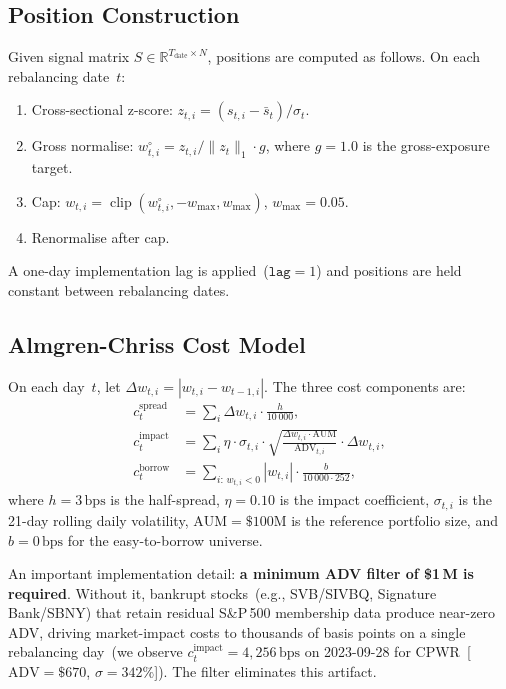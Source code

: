 \documentclass[journal]{IEEEtran}
\newcommand{\R}{\mathbb{R}}
\newcommand{\AUM}{\mathrm{AUM}}
\newcommand{\ADV}{\mathrm{ADV}}
\newcommand{\bps}{\,\mathrm{bps}}
\begin{document}
\subsection{Position Construction}
Given signal matrix $S \in \R^{T_\text{date}\times N}$, positions
are computed as follows.
On each rebalancing date~$t$:
\begin{enumerate}
  \item Cross-sectional z-score: $z_{t,i} = (s_{t,i} - \bar s_t)/\sigma_t$.
  \item Gross normalise: $w^\circ_{t,i} = z_{t,i}/\|z_t\|_1 \cdot g$,
        where $g = 1.0$ is the gross-exposure target.
  \item Cap: $w_{t,i} = \operatorname{clip}(w^\circ_{t,i},
        -w_{\max}, w_{\max})$, $w_{\max} = 0.05$.
  \item Renormalise after cap.
\end{enumerate}
A one-day implementation lag is applied~($\texttt{lag}=1$) and
positions are held constant between rebalancing dates.

\subsection{Almgren-Chriss Cost Model}
On each day~$t$, let $\Delta w_{t,i} = |w_{t,i} - w_{t-1,i}|$.
The three cost components are:
\begin{align}
  c^\text{spread}_t &= \sum_i \Delta w_{t,i}
                        \cdot \frac{h}{10\,000}, \label{eq:spread}\\[4pt]
  c^\text{impact}_t &= \sum_i \eta \cdot \sigma_{t,i}
                        \cdot \sqrt{\frac{\Delta w_{t,i} \cdot \AUM}{\ADV_{t,i}}}
                        \cdot \Delta w_{t,i}, \label{eq:impact}\\[4pt]
  c^\text{borrow}_t &= \sum_{i:\,w_{t,i}<0} |w_{t,i}|
                        \cdot \frac{b}{10\,000\cdot252},
  \label{eq:borrow}
\end{align}
where $h = 3\bps$ is the half-spread, $\eta = 0.10$ is the impact
coefficient, $\sigma_{t,i}$ is the 21-day rolling daily volatility,
$\AUM = \$100$M is the reference portfolio size, and $b = 0\bps$
for the easy-to-borrow universe.

An important implementation detail:
\textbf{a minimum ADV filter of \$1\,M is required}.
Without it, bankrupt stocks~(e.g., SVB/SIVBQ, Signature
Bank/SBNY) that retain residual S\&P\,500 membership data produce
near-zero ADV, driving market-impact costs to thousands of basis
points on a single rebalancing day~(we observe
$c^\text{impact}_t = 4{,}256\bps$ on 2023-09-28 for
CPWR~[$\ADV = \$670$, $\sigma = 342\%$]).
The filter eliminates this artifact.
\end{document}

